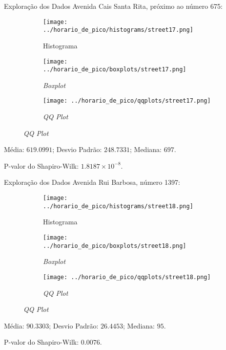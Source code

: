 \begin{frame}{Exploração dos Dados}
Avenida Cais Santa Rita, próximo ao número 675:
\vskip 0.05cm
\begin{figure}
	\centering
	\begin{subfigure}{.33\textwidth}
		\centering
		\texttt{[image: ../horario\_de\_pico/histograms/street17.png]}
		\caption*{Histograma}
	\end{subfigure}%
	\begin{subfigure}{.33\textwidth}
		\centering
		\texttt{[image: ../horario\_de\_pico/boxplots/street17.png]}
		\caption*{\textit{Boxplot}}
	\end{subfigure}
	\begin{subfigure}{.32\textwidth}
		\centering
		\texttt{[image: ../horario\_de\_pico/qqplots/street17.png]}
		\caption*{\textit{QQ Plot}}
	\end{subfigure}
\end{figure}
\vskip 0.05cm
Média: $619.0991$; Desvio Padrão: $248.7331$; Mediana: $697$.

P-valor do Shapiro-Wilk: $1.8187 \times 10^{-8}$.
\end{frame}

\begin{frame}{Exploração dos Dados}
Avenida Rui Barbosa, número 1397:
\vskip 0.05cm
\begin{figure}
	\centering
	\begin{subfigure}{.33\textwidth}
		\centering
		\texttt{[image: ../horario\_de\_pico/histograms/street18.png]}
		\caption*{Histograma}
	\end{subfigure}%
	\begin{subfigure}{.33\textwidth}
		\centering
		\texttt{[image: ../horario\_de\_pico/boxplots/street18.png]}
		\caption*{\textit{Boxplot}}
	\end{subfigure}
	\begin{subfigure}{.32\textwidth}
		\centering
		\texttt{[image: ../horario\_de\_pico/qqplots/street18.png]}
		\caption*{\textit{QQ Plot}}
	\end{subfigure}
\end{figure}
\vskip 0.05cm
Média: $90.3303$; Desvio Padrão: $26.4453$; Mediana: $95$.

P-valor do Shapiro-Wilk: $0.0076$.
\end{frame}

